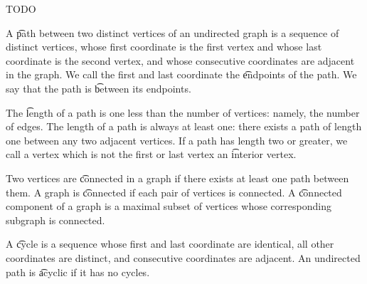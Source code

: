 
\sbasic































\sstart
{}


TODO


A \t{path} between two distinct vertices of an undirected graph is a sequence of distinct vertices, whose first coordinate is the first vertex and whose last coordinate is the second vertex, and whose consecutive coordinates are adjacent in the graph.
We call the first and last coordinate the \t{endpoints} of the path.
We say that the path is \t{between} its endpoints.

The \t{length} of a path is one less than the number of vertices: namely, the number of edges.
The length of a path is always at least one: there exists a path of length one between any two adjacent vertices.
If a path has length two or greater, we call a vertex which is not the first or last vertex an \t{interior vertex}.

Two vertices are \t{connected} in a graph if there exists at least one path between them.
A graph is \t{connected} if each pair of vertices is connected.
A \t{connected component} of a graph is a maximal subset of vertices whose corresponding subgraph is connected.

A \t{cycle} is a sequence whose first and last coordinate are identical, all other coordinates are distinct, and consecutive coordinates are adjacent.
An undirected path is \t{acyclic} if it has no cycles.

